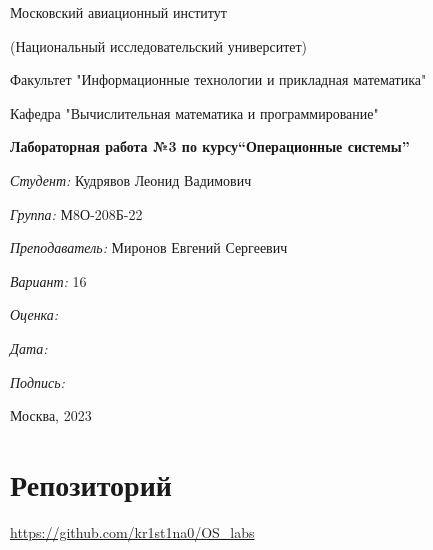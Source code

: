 \documentclass[a4paper, 12pt]{article}
\begin{document}
\thispagestyle{empty}	
\begin{center}
	Московский авиационный институт
	
	(Национальный исследовательский университет)
	
	Факультет "Информационные технологии и прикладная математика"
	
	Кафедра "Вычислительная математика и программирование"
	
\end{center}
\vspace{40ex}
\begin{center}
	\textbf{\large{Лабораторная работа №3 по курсу\linebreak \textquotedblleft Операционные системы\textquotedblright}}
\end{center}
\vspace{35ex}
\begin{flushright}
	\textit{Студент: } Кудрявов Леонид Вадимович
	
	\vspace{2ex}
	\textit{Группа: } М8О-208Б-22
	
	\vspace{2ex}
	\textit{Преподаватель: } Миронов Евгений Сергеевич
	
	\vspace{2ex}
	\textit{Вариант: } 16 
	
	\vspace{2ex}
	\textit{Оценка: } \underline{\quad\quad\quad\quad\quad\quad}
	
	 \vspace{2ex}
	\textit{Дата: } \underline{\quad\quad\quad\quad\quad\quad}
	
	\vspace{2ex}
	\textit{Подпись: } \underline{\quad\quad\quad\quad\quad\quad}
	
\end{flushright}

\vspace{5ex}

\begin{vfill}
	\begin{center}
		Москва, 2023
	\end{center}	
\end{vfill}
\newpage

\begingroup
\color{black}
\tableofcontents\newpage
\endgroup

\section{Репозиторий}
\href{https://github.com/kr1st1na0/OS\_labs}{https://github.com/kr1st1na0/OS\_labs}
\end{document}
